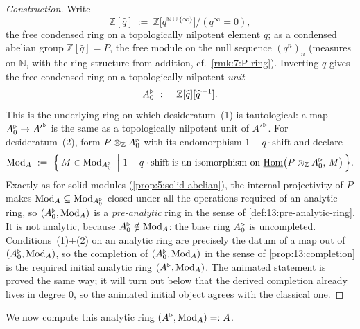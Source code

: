 \begin{proof}[Construction]
Write
\begin{equation*}
\mathbb{Z}[\widehat{q}]\ :=\ \mathbb{Z}\bigl[q^{\mathbb{N}\cup\{\infty\}}\bigr]\big/(q^{\infty}=0),
\end{equation*}
the free condensed ring on a topologically nilpotent element $q$; as a condensed
abelian group $\mathbb{Z}[\widehat{q}]=P$, the free module on the null sequence
$(q^n)_n$ (measures on $\mathbb{N}$, with the ring structure from addition, cf.\
\cref{rmk:7:P-ring}). Inverting $q$ gives the free condensed ring on a topologically
nilpotent \emph{unit}
\begin{equation*}
\ur A_0\ :=\ \mathbb{Z}[\widehat{q}][\widehat{q}^{\,-1}].
\end{equation*}
This is the underlying ring on which desideratum~(1) is tautological: a map
$A^{\triangleright}_0\to{A'}^{\triangleright}$ is the same as a topologically nilpotent unit of ${A'}^{\triangleright}$. For
desideratum~(2), form $P\otimes_{\mathbb{Z}}A^{\triangleright}_0$ with its endomorphism
$1-q\cdot\mathrm{shift}$ and declare
\begin{equation}
\label{eq:14:preanalytic-modules}
\Mod_A\ :=\ \Bigl\{\,M\in\Mod_{\ur A_0}\ \Big|\ 1-q\cdot\mathrm{shift}\ \text{is an isomorphism on}\ \iHom\bigl(P\otimes_{\mathbb{Z}}\ur A_0,\,M\bigr)\,\Bigr\}.
\end{equation}
Exactly as for solid modules (\cref{prop:5:solid-abelian}), the internal
projectivity of $P$ makes $\operatorname{Mod}_A\subseteq\operatorname{Mod}_{A^{\triangleright}_0}$ closed under all the
operations required of an analytic ring, so $(A^{\triangleright}_0,\operatorname{Mod}_A)$ is a
\emph{pre-analytic} ring in the sense of \cref{def:13:pre-analytic-ring}. It is not
analytic, because $A^{\triangleright}_0\notin\operatorname{Mod}_A$: the base ring $A^{\triangleright}_0$ is uncompleted.
Conditions~(1)$+$(2) on an analytic ring are precisely the datum of a map out of
$(A^{\triangleright}_0,\operatorname{Mod}_A)$, so the completion of $(A^{\triangleright}_0,\operatorname{Mod}_A)$ in the sense of
\cref{prop:13:completion} is the required initial analytic ring
$(A^{\triangleright},\operatorname{Mod}_A)$. The animated statement is proved the same way; it will turn out
below that the derived completion already lives in degree $0$, so the animated
initial object agrees with the classical one.
\end{proof}

We now compute this analytic ring $(A^{\triangleright},\operatorname{Mod}_A)=:A$.

